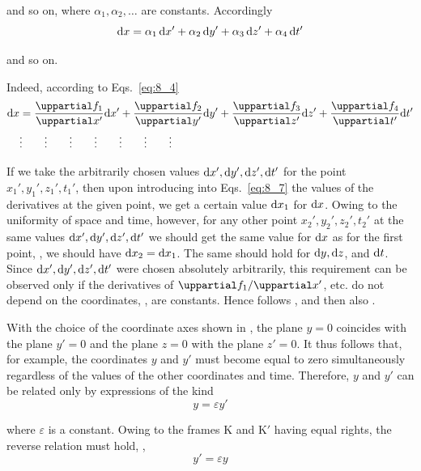 \noindent
and so on, where $\alpha_1, \alpha_2, \ldots$ are constants. Accordingly
\begin{equation}\label{eq:8_6}
	\mathrm{d} x = \alpha_1\,\mathrm{d} x' + \alpha_2\,\mathrm{d} y' + \alpha_3\,\mathrm{d} z' + \alpha_4\,\mathrm{d} t'
\end{equation}

\noindent
and so on.

Indeed, according to Eqs.~\eqref{eq:8_4}
\begin{align}
	\deriv{x} &= \diffpartial{f_1}{x'}\deriv{x'} + \diffpartial{f_2}{y'}\deriv{y'} + \diffpartial{f_3}{z'}\deriv{z'} + \diffpartial{f_4}{t'}\deriv{t'}\label{eq:8_7}\\
	&\vdots\quad\quad\vdots\quad\quad\vdots\quad\quad\vdots\quad\quad\vdots\quad\quad\vdots\quad\quad\vdots\nonumber
\end{align}

\noindent
If we take the arbitrarily chosen values $\mathrm{d} x', \mathrm{d} y', \mathrm{d} z', \mathrm{d} t'$ for the point $x_1', y_1', z_1', t_1'$, then upon introducing into Eqs.~\eqref{eq:8_7} the values of the derivatives at the given point, we get a certain value $\mathrm{d} x_1$ for $\mathrm{d} x$. Owing to the uniformity of space and time, however, for any other point $x_2', y_2', z_2', t_2'$ at the same values $\mathrm{d} x', \mathrm{d} y', \mathrm{d} z', \mathrm{d} t'$ we should get the same value for $\mathrm{d} x$ as for the first point, \ie, we should have $\mathrm{d} x_2=\mathrm{d} x_1$. The same should hold for $\mathrm{d} y, \mathrm{d} z$, and $\mathrm{d} t$. Since $\mathrm{d} x', \mathrm{d} y', \mathrm{d} z', \mathrm{d} t'$ were chosen absolutely arbitrarily, this requirement can be observed only if the derivatives of $\diffinpartial{f_1}{x'}$, etc. do not depend on the coordinates, \ie, are constants. Hence follows , and then also .

With the choice of the coordinate axes shown in , the plane $y=0$ coincides with the plane $y'=0$ and the plane $z=0$ with the plane $z'=0$. It thus follows that, for example, the coordinates $y$ and $y'$ must become equal to zero simultaneously regardless of the values of the other coordinates and time. Therefore, $y$ and $y'$ can be related only by expressions of the kind
\begin{equation*}
	y = \varepsilon y'
\end{equation*}

\noindent
where $\varepsilon$ is a constant. Owing to the frames K and K$'$ having equal rights, the reverse relation must hold, \ie,
\begin{equation*}
	y' = \varepsilon y
\end{equation*}


